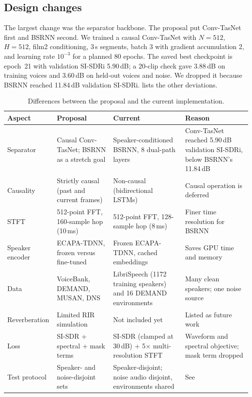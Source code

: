 \documentclass[11pt,a4paper]{article}
\newcommand{\sisdr}{SI-SDR}
\newcommand{\sisdri}{SI-SDRi}
\begin{document}
\subsection{Design changes}
The largest change was the separator backbone. The proposal put Conv-TasNet first and BSRNN
second. We trained a causal Conv-TasNet with $N=512$, $H=512$, film2 conditioning, 3\,s segments,
batch 3 with gradient accumulation 2, and learning rate $10^{-3}$ for a planned 80 epochs. The
saved best checkpoint is epoch~21 with validation \sisdri{} 5.90\,dB; a 20-clip check gave
3.88\,dB on training voices and 3.60\,dB on held-out voices and noise. We dropped it because
BSRNN reached 11.84\,dB validation \sisdri{}.  lists the other deviations.

\begin{table}[htbp]
\centering\footnotesize
\caption{Differences between the proposal and the current implementation.}
\label{tab:changes}
\begin{tabularx}{\textwidth}{@{}l Y Y Y@{}}
\toprule
\textbf{Aspect} & \textbf{Proposal} & \textbf{Current} & \textbf{Reason}\\
\midrule
Separator & Causal Conv-TasNet; BSRNN as a stretch goal & Speaker-conditioned BSRNN, 8 dual-path layers & Conv-TasNet reached 5.90\,dB validation \sisdri, below BSRNN's 11.84\,dB\\
Causality & Strictly causal (past and current frames) & Non-causal (bidirectional LSTMs) & Causal operation is deferred\\
STFT & 512-point FFT, 160-sample hop (10\,ms) & 512-point FFT, 128-sample hop (8\,ms) & Finer time resolution for BSRNN\\
Speaker encoder & ECAPA-TDNN, frozen versus fine-tuned & Frozen ECAPA-TDNN, cached embeddings & Saves GPU time and memory\\
Data & VoiceBank, DEMAND, MUSAN, DNS & LibriSpeech (1172 training speakers) and 16 DEMAND environments & Many clean speakers; one noise source\\
Reverberation & Limited RIR simulation & Not included yet & Listed as future work\\
Loss & \sisdr{} + spectral + mask terms & \sisdr{} (clamped at 30\,dB) + 5$\times$ multi-resolution STFT & Waveform and spectral objective; mask term dropped\\
Test protocol & Speaker- and noise-disjoint sets & Speaker-disjoint; noise audio disjoint, environments shared & See \\
\bottomrule
\end{tabularx}
\end{table}
\end{document}
